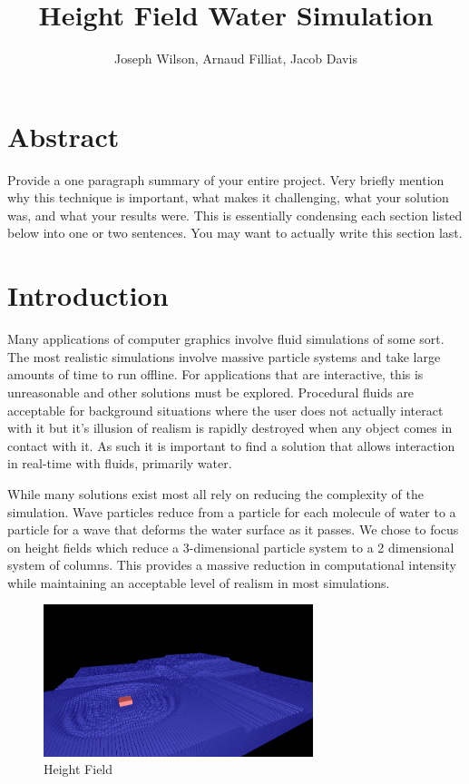 \documentclass[12pt,titlepage]{article}
\title{Height Field Water Simulation}
\author{Joseph Wilson, Arnaud Filliat, Jacob Davis}
\begin{document}
\maketitle

\section{Abstract}

Provide a one paragraph summary of your entire project. Very briefly mention why this technique is important, what makes it challenging, what your solution was, and what your results were. This is essentially condensing each section listed below into one or two sentences. You may want to actually write this section last.

\section{Introduction}

Many applications of computer graphics involve fluid simulations of some sort.  The most realistic simulations involve massive particle systems and take large amounts of time to run offline.  For applications that are interactive, this is unreasonable and other solutions must be explored.  Procedural fluids are acceptable for background situations where the user does not actually interact with it but it’s illusion of realism is rapidly destroyed when any object comes in contact with it.  As such it is important to find a solution that allows interaction in real-time with fluids, primarily water.

While many solutions exist most all rely on reducing the complexity of the 
simulation.  Wave particles reduce from a particle for each molecule of water 
to a particle for a wave that deforms the water surface as it passes.  We chose 
to focus on height fields which reduce a 3-dimensional particle system to a 2 
dimensional system of columns.  This provides a massive reduction in 
computational intensity while maintaining an acceptable level of realism in 
most simulations.

\begin{figure}[H]
    \caption{Height Field}
    \label{fig:field}
    \centering
    \includegraphics[width=0.7\textwidth]{../www/images/field}
\end{figure}
\end{document}
